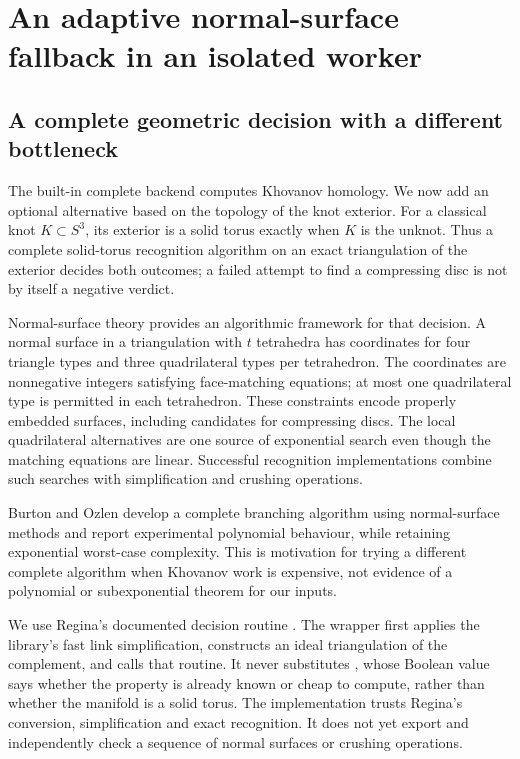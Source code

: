 \section{An adaptive normal-surface fallback in an isolated worker}
\label{sec:normal-surface}

\subsection{A complete geometric decision with a different bottleneck}

The built-in complete backend computes Khovanov homology.  We now add an
optional alternative based on the topology of the knot exterior.  For a
classical knot $K\subset S^3$, its exterior is a solid torus exactly when
$K$ is the unknot.  Thus a complete solid-torus recognition algorithm on
an exact triangulation of the exterior decides both outcomes; a failed
attempt to find a compressing disc is not by itself a negative verdict.

Normal-surface theory provides an algorithmic framework for that decision.
A normal surface in a triangulation with $t$ tetrahedra has coordinates for
four triangle types and three quadrilateral types per tetrahedron.  The
coordinates are nonnegative integers satisfying face-matching equations;
at most one quadrilateral type is permitted in each tetrahedron.  These
constraints encode properly embedded surfaces, including candidates for
compressing discs.  The local quadrilateral alternatives are one source
of exponential search even though the matching equations are linear.
Successful recognition implementations combine such searches with
simplification and crushing operations.

Burton and Ozlen \cite{burton-ozlen} develop a complete branching algorithm
using normal-surface methods and report experimental polynomial behaviour,
while retaining exponential worst-case complexity.  This is motivation for
trying a different complete algorithm when Khovanov work is expensive,
not evidence of a polynomial or subexponential theorem for our inputs.

We use Regina's documented  decision routine
\cite{regina-solid-torus}.  The wrapper first applies the library's fast
link simplification, constructs an ideal triangulation of the complement,
and calls that routine.  It never substitutes , whose
Boolean value says whether the property is already known or cheap to
compute, rather than whether the manifold is a solid torus.  The
implementation trusts Regina's conversion, simplification and exact
recognition.  It does not yet export and independently check a sequence of
normal surfaces or crushing operations.

